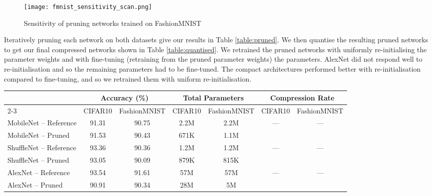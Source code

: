 \documentclass[conference]{IEEEtran}
\begin{document}
  \begin{figure}[]
      \centering
      \texttt{[image: fmnist\_sensitivity\_scan.png]}
      \caption{Sensitivity of pruning networks trained on FashionMNIST}
      \label{fig:fmnist_sen_scan}
  \end{figure}

Iteratively pruning each network on both datasets give our results in Table \ref{table:pruned}.
We then quantise the resulting pruned networks to get our final compressed networks shown in Table \ref{table:quantised}.
We retrained the pruned networks with uniformly re-initialising the parameter weights and with fine-tuning (retraining from the pruned parameter weights) the parameters. AlexNet did not respond well to re-initialisation and so the remaining parameters had to be fine-tuned. The compact architectures performed better with re-initialisation compared to fine-tuning, and so we retrained them with uniform re-initialisation. 




\begin{table*}[t]
    \centering
    \caption{Network pruning on CIFAR-10 and FashionMNIST}
    \begin{tabular}{@{\extracolsep{4pt}}lcccccc}
        \toprule
        
        \multicolumn{1}{c}{\multirow{2}{*}{\raisebox{-\heavyrulewidth}{\textbf{Network}}}} & \multicolumn{2}{c}{\textbf{Accuracy (\%)}} & \multicolumn{2}{c}{\textbf{Total Parameters}} & \multicolumn{2}{c}{\textbf{Compression Rate}} \\
        \cmidrule{2-3}
        \cmidrule{4-5}
        \cmidrule{6-7}
        {} & CIFAR10 & FashionMNIST & CIFAR10 & FashionMNIST & CIFAR10 & FashionMNIST \\ 
        \midrule
        MobileNet -- Reference  & 91.31 & 90.75 & 2.2M & 2.2M & --- & --- \\
        MobileNet -- Pruned     & 91.53 & 90.43 & 671K & 1.1M &  &  \\
        \midrule
        ShuffleNet -- Reference & 93.36 & 90.36 & 1.2M & 1.2M & --- & --- \\
        ShuffleNet -- Pruned    & 93.05 & 90.09 & 879K & 815K &  &  \\
        \midrule
        AlexNet -- Reference    & 93.54 & 91.61 & 57M & 57M & --- & --- \\
        AlexNet -- Pruned       & 90.91 & 90.34 & 28M & 5M &  &  \\
        \bottomrule
    \end{tabular}
    \label{table:pruned}
\end{table*}
\end{document}
